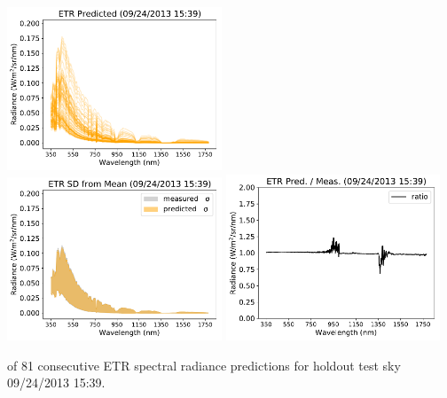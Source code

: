 \begin{center}
\includegraphics[width=0.48\textwidth]{img/09241539_predicted.pdf}\\
\vspace{0.2in}%
\includegraphics[width=0.48\textwidth]{img/09241539_std.pdf}
\includegraphics[width=0.48\textwidth]{img/09241539_ratio.pdf}
\end{center}

\clearpage
 of 81 consecutive ETR spectral radiance predictions for holdout test sky {09/24/2013 15:39}.\\%

